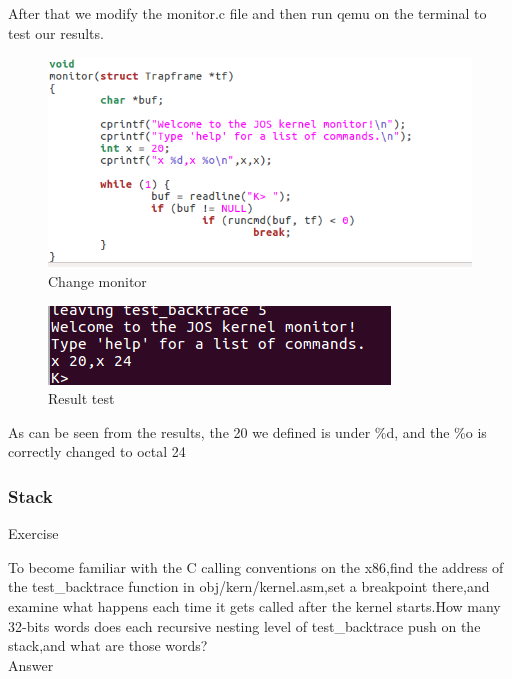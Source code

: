 After that we modify the monitor.c file and then run qemu on the terminal to test our results.
\begin{figure}[H]
  \centering
  \includegraphics[width=0.8\linewidth]{figure/monitor}
  \caption{Change monitor}\label{2}
\end{figure}
\begin{figure}[H]
  \centering
  \includegraphics[width=0.8\linewidth]{figure/resultofmonitor}
  \caption{Result test}\label{2}
\end{figure}


As can be seen from the results, the 20 we defined is under \%d, and the \%o is correctly changed to octal 24

\subsubsection{Stack}
\begin{flushleft}
{\Large Exercise}

\qquad To become familiar with the C calling conventions on the x86,find the address of the test\_backtrace function in obj/kern/kernel.asm,set a breakpoint there,and examine what happens each time it gets called after the kernel starts.How many 32-bits words does each recursive nesting level of test\_backtrace push on the stack,and what are those words?\\


{\Large Answer}\\
\end{flushleft}

